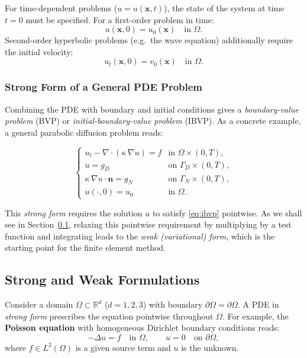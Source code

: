 \documentclass[11pt]{article}
\newcommand{\R}{\mathbb{R}}
\newcommand{\Lapl}{\Delta}
\newcommand{\domain}{\Omega}
\newcommand{\boundary}{\partial\Omega}
\begin{document}
For time-dependent problems ($u = u(\mathbf{x},t)$), the state of the
system at time $t=0$ must be specified.
For a first-order problem in time:
\begin{equation*}
  u(\mathbf{x}, 0) = u_0(\mathbf{x}) \quad \text{in } \domain.
\end{equation*}
Second-order hyperbolic problems (e.g.\ the wave equation) additionally
require the initial velocity:
\begin{equation*}
  u_t(\mathbf{x}, 0) = v_0(\mathbf{x}) \quad \text{in } \domain.
\end{equation*}

\subsubsection{Strong Form of a General PDE Problem}

Combining the PDE with boundary and initial conditions gives a
\emph{boundary-value problem} (BVP) or
\emph{initial-boundary-value problem} (IBVP).
As a concrete example, a general parabolic diffusion problem reads:

\begin{equation}
  \label{eq:ibvp}
  \begin{cases}
    u_t - \nabla\cdot(\kappa\,\nabla u) = f
      & \text{in } \domain\times(0,T), \\[4pt]
    u = g_D
      & \text{on } \Gamma_D\times(0,T), \\[4pt]
    \kappa\,\nabla u\cdot\mathbf{n} = g_N
      & \text{on } \Gamma_N\times(0,T), \\[4pt]
    u(\cdot,0) = u_0
      & \text{in } \domain.
  \end{cases}
\end{equation}

This \emph{strong form} requires the solution $u$ to satisfy
\eqref{eq:ibvp} pointwise.
As we shall see in Section~\ref{subsec:strong-weak}, relaxing this
pointwise requirement by multiplying by a test function and integrating
leads to the \emph{weak (variational) form}, which is the starting point
for the finite element method.

\subsection{Strong and Weak Formulations}
\label{subsec:strong-weak}

Consider a domain $\domain \subset \R^d$ ($d = 1, 2, 3$) with boundary
$\boundary = \partial\domain$.
A PDE in \emph{strong form} prescribes the equation pointwise throughout
$\domain$.
For example, the \textbf{Poisson equation} with homogeneous Dirichlet boundary
conditions reads:
\begin{equation}
  \label{eq:poisson-strong}
  -\Lapl u = f \quad \text{in } \domain, \qquad
  u = 0 \quad \text{on } \boundary,
\end{equation}
where $f \in L^2(\domain)$ is a given source term and $u$ is the unknown.
\end{document}
